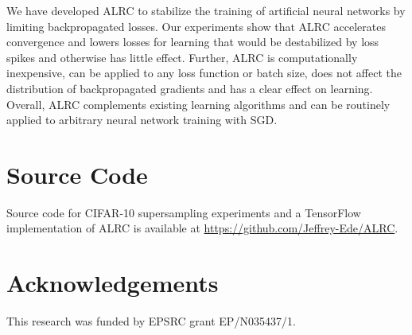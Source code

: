 \documentclass[letterpaper, 10 pt, conference]{ieeeconf}  %
\newcommand*\GitHubLoc{https://github.com/Jeffrey-Ede/ALRC}
\begin{document}
We have developed ALRC to stabilize the training of artificial neural networks by limiting backpropagated losses. Our experiments show that ALRC accelerates convergence and lowers losses for learning that would be destabilized by loss spikes and otherwise has little effect. Further, ALRC is computationally inexpensive, can be applied to any loss function or batch size, does not affect the distribution of backpropagated gradients and has a clear effect on learning. Overall, ALRC complements existing learning algorithms and can be routinely applied to arbitrary neural network training with SGD.

\section{Source Code}

Source code for CIFAR-10 supersampling experiments and a TensorFlow\cite{abadi2016tensorflow} implementation of ALRC is available at \url{\GitHubLoc}.






\section{Acknowledgements}

\noindent This research was funded by EPSRC grant EP/N035437/1.

\clearpage
\end{document}
